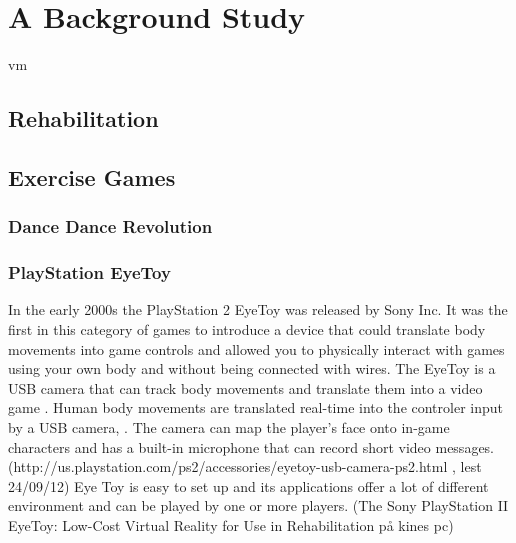 \chapter{A Background Study}
\ac{vm}
\section{Rehabilitation}

\section{Exercise Games}
\subsection{Dance Dance Revolution}
\subsection{PlayStation EyeToy}
In the early 2000s the PlayStation 2 EyeToy was released by Sony Inc. It was the first in this category of games to introduce a device that could translate body movements into game controls and allowed you to physically interact with games using your own body and without being connected with wires. The EyeToy is a USB camera that can track body movements and translate them into a video game \cite{eyetoy}. Human  body movements are translated real-time into the controler input by a USB camera, . The camera can  map the player’s face onto in-game characters and has a built-in microphone that can record short video messages. (http://us.playstation.com/ps2/accessories/eyetoy-usb-camera-ps2.html , lest 24/09/12)
Eye Toy is easy to set up and its applications offer a lot of different environment and can be played by one or more players. (The Sony PlayStation II EyeToy: Low-Cost Virtual Reality for Use in Rehabilitation på kines pc)

